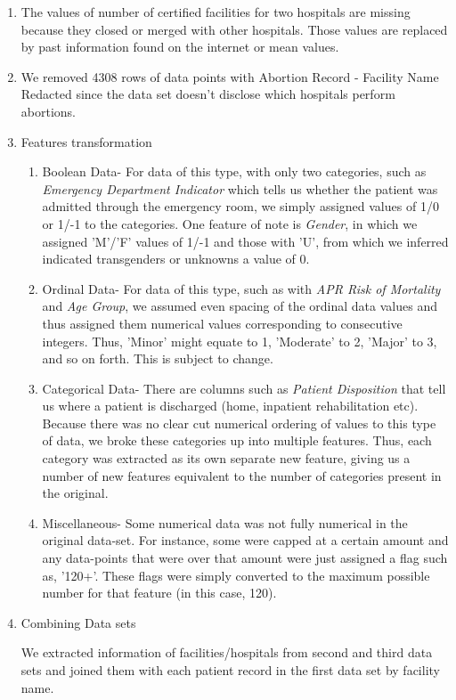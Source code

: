 \documentclass[letterpaper,11pt]{article}
\begin{document}
\begin{enumerate}
  \item The values of number of certified facilities for two hospitals are missing because they closed or merged with other hospitals. Those values are replaced by past information found on the internet or mean values. 
  
  \item We removed 4308 rows of data points with Abortion Record - Facility Name Redacted since the data set doesn't disclose which hospitals perform abortions. 
  
  \item Features transformation
  	\begin{enumerate}
  	\item Boolean Data- For data of this type, with only two categories, such as \textit{Emergency Department Indicator} which tells us whether the patient was admitted through the emergency room, we simply assigned values of 1/0 or 1/-1 to the categories. One feature of note is \textit{Gender}, in which we assigned 'M'/'F' values of 1/-1 and those with 'U', from which we inferred indicated transgenders or unknowns a value of 0. 
    
    \item Ordinal Data- For data of this type, such as with \textit{APR Risk of Mortality} and \textit{Age Group}, we assumed even spacing of the ordinal data values and thus assigned them numerical values corresponding to consecutive integers. Thus, 'Minor' might equate to 1, 'Moderate' to 2, 'Major' to 3, and so on forth. This is subject to change.
    
    \item Categorical Data- There are columns such as \textit{Patient Disposition} that tell us where a patient is discharged (home, inpatient rehabilitation etc). Because there was no clear cut numerical ordering of values to this type of data, we broke these categories up into multiple features. Thus, each category was extracted as its own separate new feature, giving us a number of new features equivalent to the number of categories present in the original. 
    
    \item Miscellaneous- Some numerical data was not fully numerical in the original data-set. For instance, some were capped at a certain amount and any data-points that were over that amount were just assigned a flag such as, '120+'. These flags were simply converted to the maximum possible number for that feature (in this case, 120).
  	\end{enumerate}
  
  \item Combining Data sets
  
  We extracted information of facilities/hospitals from second and third data sets and joined them with each patient record in the first data set by facility name. 
  
\end{enumerate}
\end{document}
